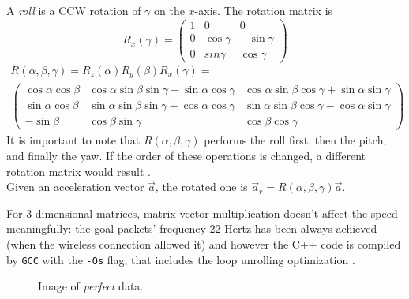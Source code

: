 A \textit{roll} is a CCW rotation of $\gamma$ on the $x$-axis. The rotation matrix is
\[
	R_x(\gamma) =
	\begin{pmatrix}
		1 & 0 & 0 \\
		0 & \cos\gamma & -\sin\gamma \\
		0 & sin\gamma & \cos\gamma
	\end{pmatrix}
\]
\begin{gather*}
	R(\alpha, \beta, \gamma) = R_z(\alpha) R_y(\beta) R_x(\gamma) = \\
	\begin{pmatrix}
		\cos\alpha \cos\beta & \cos\alpha \sin\beta \sin\gamma - \sin\alpha \cos\gamma & \cos\alpha \sin\beta \cos\gamma + \sin\alpha \sin\gamma \\
		\sin\alpha \cos\beta & \sin\alpha \sin\beta \sin\gamma + \cos\alpha \cos\gamma & \sin\alpha \sin\beta \cos\gamma - \cos\alpha \sin\gamma \\
		-\sin\beta & \cos\beta \sin\gamma & \cos\beta \cos\gamma
	\end{pmatrix}
\end{gather*}
It is important to note that $R(\alpha, \beta, \gamma)$ performs the roll first, then the pitch, and finally the yaw. If the order of these operations is changed, a different rotation matrix would result \cite{Lav06}.\\
Given an acceleration vector $\vec a$, the rotated one is $\vec a_r = R(\alpha, \beta, \gamma) \vec a$.
\bigbreak

For 3-dimensional matrices, matrix-vector multiplication doesn't affect the speed meaningfully: the goal packets' frequency 22 Hertz has been always achieved (when the wireless connection allowed it) and however the C++ code is compiled by \texttt{GCC} with the \texttt{-Os} flag, that includes the loop unrolling optimization \cite{UsingGCC}.

\begin{center}
	\begin{figure}[ht!]
		\caption{Image of \textit{perfect} data.}
	\end{figure}
\end{center}

